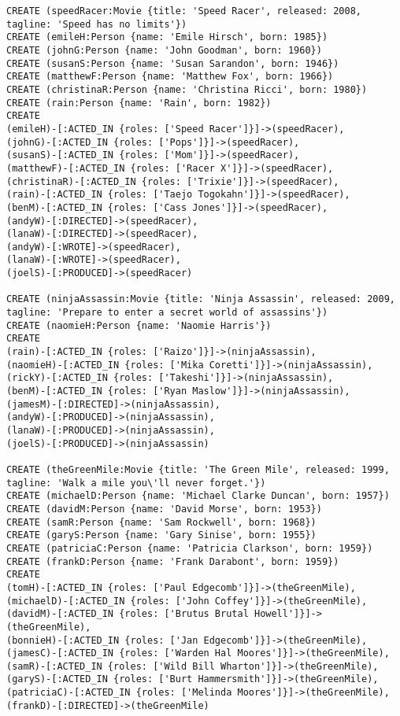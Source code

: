 \begin{lstlisting}
CREATE (speedRacer:Movie {title: 'Speed Racer', released: 2008, tagline: 'Speed has no limits'})
CREATE (emileH:Person {name: 'Emile Hirsch', born: 1985})
CREATE (johnG:Person {name: 'John Goodman', born: 1960})
CREATE (susanS:Person {name: 'Susan Sarandon', born: 1946})
CREATE (matthewF:Person {name: 'Matthew Fox', born: 1966})
CREATE (christinaR:Person {name: 'Christina Ricci', born: 1980})
CREATE (rain:Person {name: 'Rain', born: 1982})
CREATE
(emileH)-[:ACTED_IN {roles: ['Speed Racer']}]->(speedRacer),
(johnG)-[:ACTED_IN {roles: ['Pops']}]->(speedRacer),
(susanS)-[:ACTED_IN {roles: ['Mom']}]->(speedRacer),
(matthewF)-[:ACTED_IN {roles: ['Racer X']}]->(speedRacer),
(christinaR)-[:ACTED_IN {roles: ['Trixie']}]->(speedRacer),
(rain)-[:ACTED_IN {roles: ['Taejo Togokahn']}]->(speedRacer),
(benM)-[:ACTED_IN {roles: ['Cass Jones']}]->(speedRacer),
(andyW)-[:DIRECTED]->(speedRacer),
(lanaW)-[:DIRECTED]->(speedRacer),
(andyW)-[:WROTE]->(speedRacer),
(lanaW)-[:WROTE]->(speedRacer),
(joelS)-[:PRODUCED]->(speedRacer)

CREATE (ninjaAssassin:Movie {title: 'Ninja Assassin', released: 2009,
tagline: 'Prepare to enter a secret world of assassins'})
CREATE (naomieH:Person {name: 'Naomie Harris'})
CREATE
(rain)-[:ACTED_IN {roles: ['Raizo']}]->(ninjaAssassin),
(naomieH)-[:ACTED_IN {roles: ['Mika Coretti']}]->(ninjaAssassin),
(rickY)-[:ACTED_IN {roles: ['Takeshi']}]->(ninjaAssassin),
(benM)-[:ACTED_IN {roles: ['Ryan Maslow']}]->(ninjaAssassin),
(jamesM)-[:DIRECTED]->(ninjaAssassin),
(andyW)-[:PRODUCED]->(ninjaAssassin),
(lanaW)-[:PRODUCED]->(ninjaAssassin),
(joelS)-[:PRODUCED]->(ninjaAssassin)

CREATE (theGreenMile:Movie {title: 'The Green Mile', released: 1999,
tagline: 'Walk a mile you\'ll never forget.'})
CREATE (michaelD:Person {name: 'Michael Clarke Duncan', born: 1957})
CREATE (davidM:Person {name: 'David Morse', born: 1953})
CREATE (samR:Person {name: 'Sam Rockwell', born: 1968})
CREATE (garyS:Person {name: 'Gary Sinise', born: 1955})
CREATE (patriciaC:Person {name: 'Patricia Clarkson', born: 1959})
CREATE (frankD:Person {name: 'Frank Darabont', born: 1959})
CREATE
(tomH)-[:ACTED_IN {roles: ['Paul Edgecomb']}]->(theGreenMile),
(michaelD)-[:ACTED_IN {roles: ['John Coffey']}]->(theGreenMile),
(davidM)-[:ACTED_IN {roles: ['Brutus Brutal Howell']}]->(theGreenMile),
(bonnieH)-[:ACTED_IN {roles: ['Jan Edgecomb']}]->(theGreenMile),
(jamesC)-[:ACTED_IN {roles: ['Warden Hal Moores']}]->(theGreenMile),
(samR)-[:ACTED_IN {roles: ['Wild Bill Wharton']}]->(theGreenMile),
(garyS)-[:ACTED_IN {roles: ['Burt Hammersmith']}]->(theGreenMile),
(patriciaC)-[:ACTED_IN {roles: ['Melinda Moores']}]->(theGreenMile),
(frankD)-[:DIRECTED]->(theGreenMile)


\end{lstlisting}
